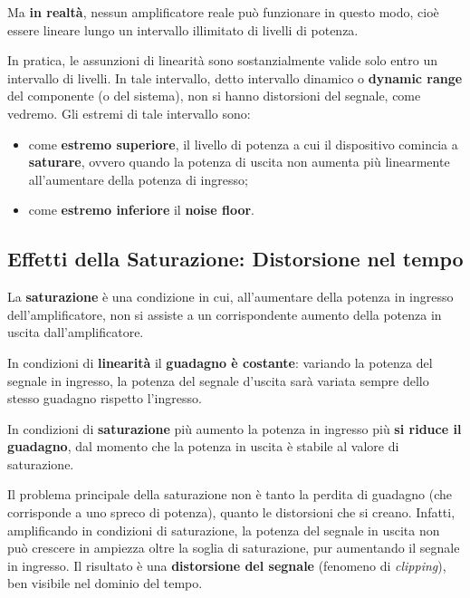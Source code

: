 \documentclass[openany,a4paper,12pt]{book}
\begin{document}

Ma \textbf{in realtà}, nessun amplificatore reale può funzionare in questo modo, cioè essere lineare lungo un intervallo illimitato di livelli di potenza.

In pratica, le assunzioni di linearità sono sostanzialmente valide solo entro un intervallo di livelli. In tale intervallo, detto intervallo dinamico o \textbf{dynamic range} del componente (o del sistema), non si hanno distorsioni del segnale, come vedremo. Gli estremi di tale intervallo sono:
\begin{itemize}[label=\textcolor{PoliBlue}{\textbullet}]
    \item come \textbf{estremo superiore}, il livello di potenza a cui il dispositivo comincia a \textbf{saturare}, ovvero quando la potenza di uscita non aumenta più linearmente all'aumentare della potenza di ingresso;
    \item come \textbf{estremo inferiore} il \textbf{noise floor}.
\end{itemize}

\subsection*{Effetti della Saturazione: Distorsione nel tempo}

La \textbf{saturazione} è una condizione in cui, all'aumentare della potenza in ingresso dell'amplificatore, non si assiste a un corrispondente aumento della potenza in uscita dall'amplificatore.

In condizioni di \textbf{linearità} il \textbf{guadagno è costante}: variando la potenza del segnale in ingresso, la potenza del segnale d'uscita sarà variata sempre dello stesso guadagno rispetto l'ingresso.

In condizioni di \textbf{saturazione} più aumento la potenza in ingresso più \textbf{si riduce il guadagno}, dal momento che la potenza in uscita è stabile al valore di saturazione.

Il problema principale della saturazione non è tanto la perdita di guadagno (che corrisponde a uno spreco di potenza), quanto le distorsioni che si creano. Infatti, amplificando in condizioni di saturazione, la potenza del segnale in uscita non può crescere in ampiezza oltre la soglia di saturazione, pur aumentando il segnale in ingresso. 
Il risultato è una \textbf{distorsione del segnale} (fenomeno di \textit{clipping}), ben visibile nel dominio del tempo.
\end{document}
